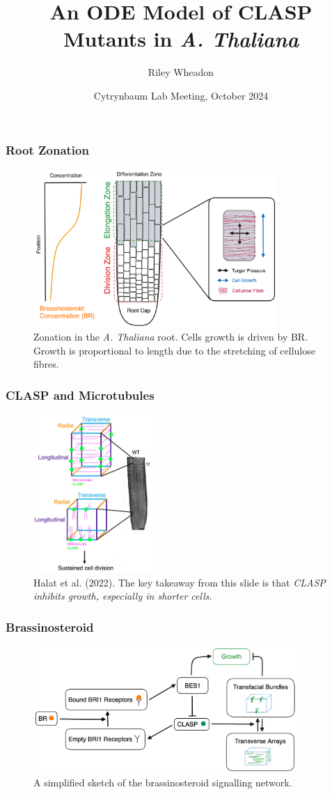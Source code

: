 \documentclass{beamer}
\title{An ODE Model of CLASP Mutants in \emph{A. Thaliana}}
\author{Riley Wheadon}
\institute{University of British Columbia}
\date{Cytrynbaum Lab Meeting, October 2024}
\begin{document}
\frame{\titlepage}

\begin{frame}
\frametitle{Root Zonation}
\begin{figure}
    \centering
    \includegraphics[height=6cm]{root-zonation.png}
    \caption{Zonation in the \emph{A. Thaliana} root. Cells growth is driven by BR. Growth is proportional to length due to the stretching of cellulose fibres.}
\end{figure}
\end{frame}

\begin{frame}
\frametitle{CLASP and Microtubules}
\begin{figure}
    \centering
    \includegraphics[height=6cm]{clasp-length-effect.png}
    \caption{Halat et al. (2022). The key takeaway from this slide is that \emph{CLASP inhibits growth, especially in shorter cells}.}
\end{figure}
\end{frame}

\begin{frame}
\frametitle{Brassinosteroid}

\begin{figure}
    \centering
    \includegraphics[width=10cm]{br-signalling.png}
    \caption{A simplified sketch of the brassinosteroid signalling network.}
\end{figure}
\end{frame}
\end{document}
